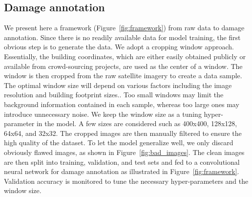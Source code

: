 \documentclass[journal, 12pt, onecolumn,draftclsnofoot]{IEEEtran}
\begin{document}
\subsection{Damage annotation}\label{sec:annotation}
We present here a framework (Figure~\ref{fig:framework}) from raw data to damage annotation. Since there is no readily available data for model training, the first obvious step is to generate the data. We adopt a cropping window approach. Essentially, the building coordinates, which are either easily obtained publicly or available from crowd-sourcing projects, are used as the center of a window. The window is then cropped from the raw satellite imagery to create a data sample. The optimal window size will depend on various factors including the image resolution and building footprint sizes.. Too small windows may limit the background information contained in each sample, whereas too large ones may introduce unnecessary noise. We keep the window size as a tuning hyper-parameter in the model. A few sizes are considered such as 400x400, 128x128, 64x64, and 32x32. The cropped images are then manually filtered to ensure the high quality of the dataset. To let the model generalize well, we only discard obviously flawed images, as shown in Figure~\ref{fig:bad_images}. The clean images are then split into training, validation, and test sets and fed to a convolutional neural network for damage annotation as illustrated in Figure~\ref{fig:framework}. Validation accuracy is monitored to tune the necessary hyper-parameters and the window size.
\end{document}
